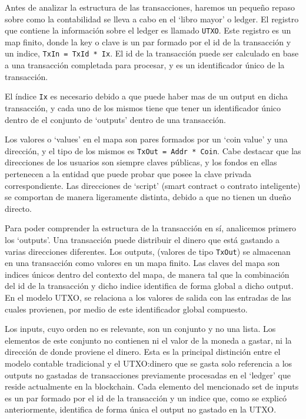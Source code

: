 \documentclass[12pt]{book}
\begin{document}

Antes de analizar la estructura de las transacciones, haremos un pequeño repaso sobre como la contabilidad se lleva a cabo en el `libro mayor' o ledger. El registro que contiene la información sobre el ledger es llamado \texttt{UTXO}. Este registro es un map finito, donde la key o clave is un par formado por el id de la transacción y un indice, \texttt{TxIn = TxId * Ix}. El id de la transacción puede ser calculado en base a una transacción completada para procesar, y es un identificador único de la transacción.

El índice \texttt{Ix} es necesario debido a que puede haber mas de un output en dicha transacción, y cada uno de los mismos tiene que tener un identificador único dentro de el conjunto de `outputs' dentro de una transacción.

Los valores o `values' en el mapa son pares formados por un `coin value' y una dirección, y el tipo de los mismos es \texttt{TxOut = Addr * Coin}. Cabe destacar que las direcciones de los usuarios son siempre claves públicas, y los fondos en ellas pertenecen a la entidad que puede probar que posee la clave privada correspondiente. Las direcciones de `script' (smart contract o contrato inteligente) se comportan de manera ligeramente distinta, debido a que no tienen un dueño directo.

Para poder comprender la estructura de la transacción en sí, analicemos primero los `outputs'. Una transacción puede distribuir el dinero que está gastando a varias direcciones diferentes. Los outputs, (valores de tipo \texttt{TxOut}) se almacenan en una transacción como valores en un mapa finito.
Las claves del mapa son indices únicos dentro del contexto del mapa, de manera tal que la combinación del id de la transacción y dicho indice identifica de forma global a dicho output.
En el modelo UTXO, se relaciona a los valores de salida con las entradas de las cuales provienen, por medio de este identificador global compuesto.


Los inputs, cuyo orden no es relevante, son un conjunto y no una lista. Los elementos de este conjunto no contienen ni el valor de la moneda a gastar, ni la dirección de donde proviene el dinero. Esta es la principal distinción entre el modelo contable tradicional y el UTXO:\@el dinero que se gasta solo referencia a los outputs no gastadas de transacciones previamente procesadas en el `ledger' que reside actualmente en la blockchain. Cada elemento del mencionado set de inputs es un par formado por el id de la transacción y un indice que, como se explicó anteriormente, identifica de forma única el output no gastado en la UTXO.\@
\end{document}
